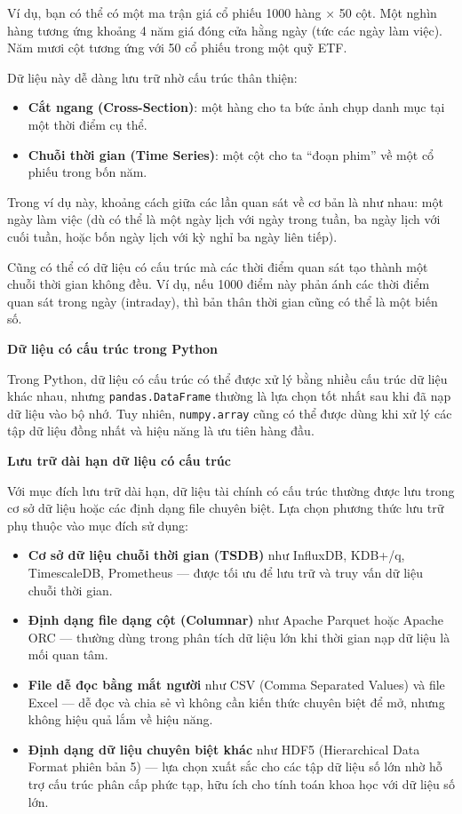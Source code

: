 Ví dụ, bạn có thể có một ma trận giá cổ phiếu 1000 hàng × 50 cột. Một nghìn hàng tương ứng khoảng 4 năm giá đóng cửa hằng ngày (tức các ngày làm việc). Năm mươi cột tương ứng với 50 cổ phiếu trong một quỹ ETF.

Dữ liệu này dễ dàng lưu trữ nhờ cấu trúc thân thiện:
\begin{itemize}
  \item \textbf{Cắt ngang (Cross-Section)}: một hàng cho ta bức ảnh chụp danh mục tại một thời điểm cụ thể.
  \item \textbf{Chuỗi thời gian (Time Series)}: một cột cho ta ``đoạn phim'' về một cổ phiếu trong bốn năm.
\end{itemize}

Trong ví dụ này, khoảng cách giữa các lần quan sát về cơ bản là như nhau: một ngày làm việc (dù có thể là một ngày lịch với ngày trong tuần, ba ngày lịch với cuối tuần, hoặc bốn ngày lịch với kỳ nghỉ ba ngày liên tiếp).

Cũng có thể có dữ liệu có cấu trúc mà các thời điểm quan sát tạo thành một chuỗi thời gian không đều. Ví dụ, nếu 1000 điểm này phản ánh các thời điểm quan sát trong ngày (intraday), thì bản thân thời gian cũng có thể là một biến số.

\textbf{Dữ liệu có cấu trúc trong Python}

Trong Python, dữ liệu có cấu trúc có thể được xử lý bằng nhiều cấu trúc dữ liệu khác nhau, nhưng \texttt{pandas.DataFrame} thường là lựa chọn tốt nhất sau khi đã nạp dữ liệu vào bộ nhớ. Tuy nhiên, \texttt{numpy.array} cũng có thể được dùng khi xử lý các tập dữ liệu đồng nhất và hiệu năng là ưu tiên hàng đầu.

\textbf{Lưu trữ dài hạn dữ liệu có cấu trúc}

Với mục đích lưu trữ dài hạn, dữ liệu tài chính có cấu trúc thường được lưu trong cơ sở dữ liệu hoặc các định dạng file chuyên biệt. Lựa chọn phương thức lưu trữ phụ thuộc vào mục đích sử dụng:
\begin{itemize}
  \item \textbf{Cơ sở dữ liệu chuỗi thời gian (TSDB)} như InfluxDB, KDB+/q, TimescaleDB, Prometheus — được tối ưu để lưu trữ và truy vấn dữ liệu chuỗi thời gian.
  \item \textbf{Định dạng file dạng cột (Columnar)} như Apache Parquet hoặc Apache ORC — thường dùng trong phân tích dữ liệu lớn khi thời gian nạp dữ liệu là mối quan tâm.
  \item \textbf{File dễ đọc bằng mắt người} như CSV (Comma Separated Values) và file Excel — dễ đọc và chia sẻ vì không cần kiến thức chuyên biệt để mở, nhưng không hiệu quả lắm về hiệu năng.
  \item \textbf{Định dạng dữ liệu chuyên biệt khác} như HDF5 (Hierarchical Data Format phiên bản 5) — lựa chọn xuất sắc cho các tập dữ liệu số lớn nhờ hỗ trợ cấu trúc phân cấp phức tạp, hữu ích cho tính toán khoa học với dữ liệu số lớn.
\end{itemize}

